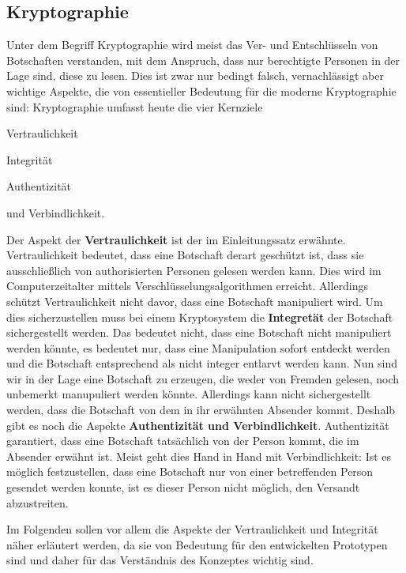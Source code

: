 \documentclass[12pt,a4paper,bibliography=totocnumbered,listof=totocnumbered]{scrartcl}
\begin{document}
\subsection{Kryptographie}\label{KryptV}
Unter dem Begriff Kryptographie wird meist das Ver- und Entschlüsseln von Botschaften verstanden, mit dem Anspruch, dass nur berechtigte Personen in der Lage sind, diese zu lesen. Dies ist zwar nur bedingt falsch, vernachlässigt aber wichtige Aspekte, die von essentieller Bedeutung für die moderne Kryptographie sind: Kryptographie umfasst heute die vier Kernziele
\begin{compactitem}
	\item Vertraulichkeit
	\item Integrität
	\item Authentizität
	\item und Verbindlichkeit.
\end{compactitem}
Der Aspekt der \textbf{Vertraulichkeit} ist der im Einleitungssatz erwähnte. Vertraulichkeit bedeutet, dass eine Botschaft derart geschützt ist, dass sie ausschließlich von authorisierten Personen gelesen werden kann. Dies wird im Computerzeitalter mittels Verschlüsselungsalgorithmen erreicht. Allerdings schützt Vertraulichkeit nicht davor, dass eine Botschaft manipuliert wird. Um dies sicherzustellen muss bei einem Kryptosystem die \textbf{Integretät} der Botschaft sichergestellt werden. Das bedeutet nicht, dass eine Botschaft nicht manipuliert werden könnte, es bedeutet nur, dass eine Manipulation sofort entdeckt werden und die Botschaft entsprechend als nicht integer entlarvt werden kann. Nun sind wir in der Lage eine Botschaft zu erzeugen, die weder von Fremden gelesen, noch unbemerkt manupuliert werden könnte. Allerdings kann nicht sichergestellt werden, dass die Botschaft von dem in ihr erwähnten Absender kommt. Deshalb gibt es noch die Aspekte \textbf{Authentizität und Verbindlichkeit}. Authentizität garantiert, dass eine Botschaft tatsächlich von der Person kommt, die im Absender erwähnt ist. Meist geht dies Hand in Hand mit Verbindlichkeit: Ist es möglich festzustellen, dass eine Botschaft nur von einer betreffenden Person gesendet werden konnte, ist es dieser Person nicht möglich, den Versandt abzustreiten. \cite[S. 2]{42}

Im Folgenden sollen vor allem die Aspekte der Vertraulichkeit und Integrität näher erläutert werden, da sie von Bedeutung für den entwickelten Prototypen sind und daher für das Verständnis des Konzeptes wichtig sind.
\end{document}
